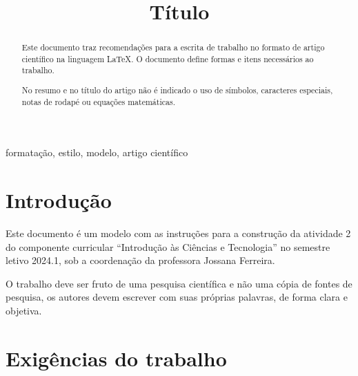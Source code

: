 \documentclass[conference]{ModeloA}
\begin{document}
\title{Título}

\author{
\and
}


\maketitle
\begin{abstract}

Este documento traz recomendações para a escrita de trabalho no formato de artigo científico na linguagem \LaTeX. O documento define formas e itens necessários ao trabalho. 

No resumo e no título do artigo não é indicado o uso de símbolos, caracteres especiais, notas de rodapé ou equações matemáticas.

\end{abstract}

\begin{IEEEkeywords}
formatação, estilo, modelo, artigo científico
\end{IEEEkeywords}


\section{Introdução}
Este documento é um modelo com as instruções para a construção da atividade 2 do componente curricular ``Introdução às Ciências e Tecnologia'' no semestre letivo 2024.1, sob a coordenação da professora Jossana Ferreira. 

O trabalho deve ser fruto de uma pesquisa científica e não uma cópia de fontes de pesquisa, os autores devem escrever com suas próprias palavras, de forma clara e objetiva.


\section{Exigências do trabalho}
\end{document}
